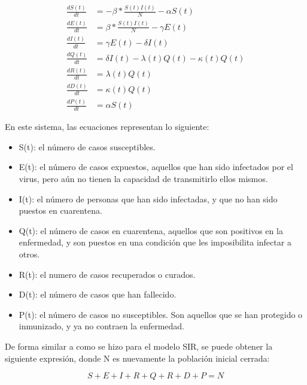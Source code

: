 \begin{equation} \label{PENG}
    \begin{split}
    \frac{dS(t)}{dt} & = - \beta * \frac{S(t) I(t)}{N} - \alpha S(t) \\
    \frac{dE(t)}{dt} & = \beta * \frac{S(t) I(t)}{N} - \gamma E(t) \\
    \frac{dI(t)}{dt} & = \gamma E(t) - \delta I(t) \\
    \frac{dQ(t)}{dt} & = \delta I(t) - \lambda(t) Q(t) - \kappa(t) Q(t) \\
    \frac{dR(t)}{dt} & = \lambda(t) Q(t) \\
    \frac{dD(t)}{dt} & = \kappa(t) Q(t) \\
    \frac{dP(t)}{dt} & = \alpha S(t)
    \end{split}
\end{equation}

En este sistema, las ecuaciones representan lo siguiente:
\begin{itemize}
    \item S(t): el número de casos susceptibles.
    \item E(t): el número de casos expuestos, aquellos que han sido infectados por el virus, pero aún no tienen la capacidad de transmitirlo ellos mismos.
    \item I(t): el número de personas que han sido infectadas, y que no han sido puestos en cuarentena.
    \item Q(t): el número de casos en cuarentena, aquellos que son positivos en la enfermedad, y son puestos en una condición que les imposibilita infectar a otros.
    \item R(t): el numero de casos recuperados o curados.
    \item D(t): el número de casos que han fallecido.
    \item P(t): el número de casos no susceptibles. Son aquellos que se han protegido o inmunizado, y ya no contraen la enfermedad.
\end{itemize}

De forma similar a como se hizo para el modelo SIR, se puede obtener la siguiente expresión, donde N es nuevamente la población inicial cerrada:

\begin{equation}
    S + E + I + R + Q + R + D + P = N
\end{equation}

